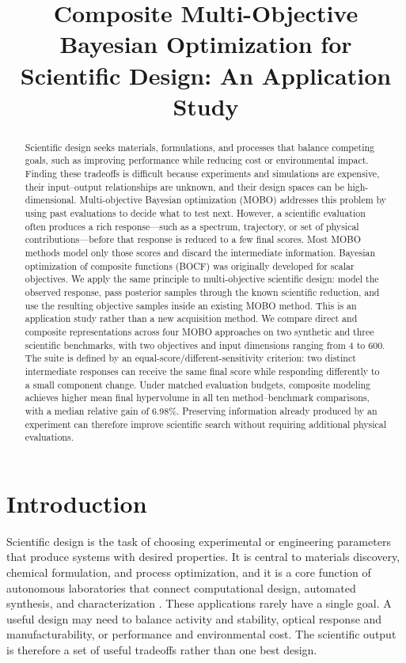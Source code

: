 \documentclass{article}
\title{Composite Multi-Objective Bayesian Optimization for Scientific Design: An Application Study}
\author{}
\begin{document}
\maketitle

\begin{abstract}
Scientific design seeks materials, formulations, and processes that balance
competing goals, such as improving performance while reducing cost or
environmental impact.  Finding these tradeoffs is difficult because experiments
and simulations are expensive, their input--output relationships are unknown,
and their design spaces can be high-dimensional.  Multi-objective Bayesian
optimization (MOBO) addresses this problem by using past evaluations to decide
what to test next.  However, a scientific evaluation often produces a rich
response---such as a spectrum, trajectory, or set of physical
contributions---before that response is reduced to a few final scores.  Most
MOBO methods model only those scores and discard the intermediate information.
Bayesian optimization of composite functions (BOCF) was originally developed
for scalar objectives.  We apply the same principle to multi-objective
scientific design: model the observed response, pass posterior samples through
the known scientific reduction, and use the resulting objective samples inside
an existing MOBO method.  This is an application study rather than a new
acquisition method.  We compare direct and composite representations across
four MOBO approaches on two synthetic and three scientific benchmarks, with
two objectives and input dimensions ranging from 4 to 600.  The suite is
defined by an equal-score/different-sensitivity criterion: two distinct
intermediate responses can receive the same final score while responding
differently to a small component change.  Under matched evaluation budgets,
composite modeling achieves higher mean final hypervolume in all ten
method--benchmark comparisons, with a median relative gain of 6.98\%.
Preserving information already produced by an experiment can therefore improve
scientific search without requiring additional physical evaluations.
\end{abstract}

\section{Introduction}
\label{sec:introduction}

Scientific design is the task of choosing experimental or engineering
parameters that produce systems with desired properties.  It is central to
materials discovery, chemical formulation, and process optimization, and it is
a core function of autonomous laboratories that connect computational design,
automated synthesis, and characterization
\cite{lookman2019active,stach2021autonomous}.  These applications rarely have a
single goal.  A useful design may need to balance activity and stability,
optical response and manufacturability, or performance and environmental cost.
The scientific output is therefore a set of useful tradeoffs rather than one
best design.
\end{document}
